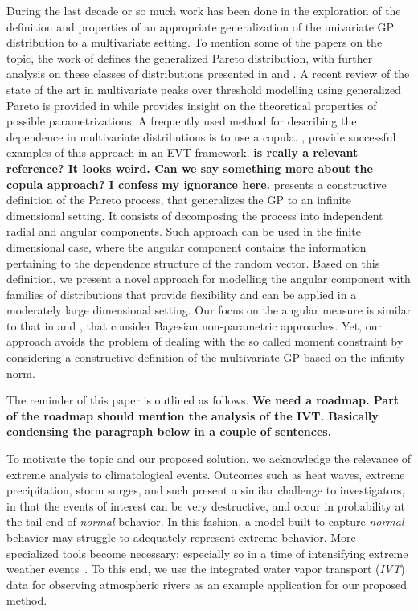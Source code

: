 During the last decade or so much work has been done in the exploration of the definition and properties of an
  appropriate generalization of the univariate GP distribution 
  to a multivariate setting.  To mention some of the papers on the topic, the work of
  \cite{rootzen2006} defines the generalized Pareto distribution, with further analysis on these classes
  of distributions presented in \cite{falk2008} and \cite{michel2008}.  A recent review of the state
  of the art in multivariate peaks over threshold modelling using generalized Pareto is provided in
  \cite{rootzen2018} while \cite{RoSeWa2018a} provides insight on the theoretical properties of possible parametrizations. 
  A frequently used method for describing the dependence
  in multivariate distributions is to use a copula. \cite{renard2007,deng2011,falk2019}, provide successful examples of this approach in an EVT framework. {\bf is \cite{deng2011} really a relevant reference? It looks weird. Can we say something more about the copula approach? I confess my ignorance here.}
  \cite{ferreira2014} presents a constructive definition of the Pareto process, that generalizes the GP to an infinite dimensional setting. It consists of decomposing the process into independent radial and angular components. Such approach can be used in the finite dimensional case, where the angular component 
  contains the information pertaining to the dependence structure of the random vector.
  Based on this definition, we present a novel approach for modelling  the angular component
  with families of distributions that provide flexibility and can be applied in a moderately large dimensional setting.
  Our focus on the  angular measure is similar to that in \cite{SaNa2014} and \cite{HaCaCh2017}, that consider Bayesian non-parametric approaches. Yet, our approach avoids the problem of dealing with the so called moment constraint by considering a constructive definition of the multivariate GP based on the infinity norm.
  
  The reminder of this paper is outlined as follows. {\bf We need a roadmap. Part of the roadmap should mention the analysis of the IVT. Basically condensing the paragraph below in a couple of sentences.}

To motivate the topic and our proposed solution, we acknowledge the relevance of extreme analysis to
  climatological events.  Outcomes such as heat waves, extreme precipitation, storm surges, and
  such present a similar challenge to investigators, in that the events of interest can be very destructive,
  and occur in probability at the tail end of \emph{normal} behavior.  In this fashion, a model built
  to capture \emph{normal} behavior may struggle to adequately represent extreme behavior.  More
  specialized tools become necessary; especially so in a time of intensifying extreme weather
  events~\citep{jentsch2007,vousdoukas2018,li2019}.  To this end, we use the integrated water vapor
  transport (\emph{IVT}) data for observing atmospheric rivers as an example application for our proposed method.
  
